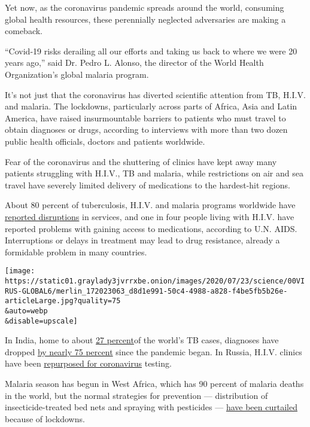 Yet now, as the coronavirus pandemic spreads around the world, consuming
global health resources, these perennially neglected adversaries are
making a comeback.

``Covid-19 risks derailing all our efforts and taking us back to where
we were 20 years ago,'' said Dr. Pedro L. Alonso, the director of the
World Health Organization's global malaria program.

It's not just that the coronavirus has diverted scientific attention
from TB, H.I.V. and malaria. The lockdowns, particularly across parts of
Africa, Asia and Latin America, have raised insurmountable barriers to
patients who must travel to obtain diagnoses or drugs, according to
interviews with more than two dozen public health officials, doctors and
patients worldwide.

Fear of the coronavirus and the shuttering of clinics have kept away
many patients struggling with H.I.V., TB and malaria, while restrictions
on air and sea travel have severely limited delivery of medications to
the hardest-hit regions.

About 80 percent of tuberculosis, H.I.V. and malaria programs worldwide
have
\href{https://www.theglobalfund.org/en/covid-19/news/2020-06-17-global-fund-survey-majority-of-hiv-tb-and-malaria-programs-face-disruptions-as-a-result-of-covid-19/}{reported
disruptions} in services, and one in four people living with H.I.V. have
reported problems with gaining access to medications, according to U.N.
AIDS. Interruptions or delays in treatment may lead to drug resistance,
already a formidable problem in many countries.

\texttt{[image: https://static01.graylady3jvrrxbe.onion/images/2020/07/23/science/00VIRUS-GLOBAL6/merlin\_172023063\_d8d1e991-50c4-4988-a828-f4be5fb5b26e-articleLarge.jpg?quality=75\\\&auto=webp\\\&disable=upscale]}

In India, home to about
\href{https://www.who.int/tb/publications/global_report/gtbr2018_main_text_28Feb2019.pdf}{27
percent}of the world's TB cases, diagnoses have dropped
\href{https://reports.nikshay.in/Reports/TBNotification}{by nearly 75
percent} since the pandemic began. In Russia, H.I.V. clinics have been
\href{https://www.unaids.org/en/resources/presscentre/featurestories/2020/may/20200514_russian-federation-covid19}{repurposed
for coronavirus} testing.

Malaria season has begun in West Africa, which has 90 percent of malaria
deaths in the world, but the normal strategies for prevention ---
distribution of insecticide-treated bed nets and spraying with
pesticides ---
\href{https://www.who.int/emergencies/diseases/novel-coronavirus-2019/question-and-answers-hub/q-a-detail/malaria-and-the-covid-19-pandemic}{have
been curtailed} because of lockdowns.

